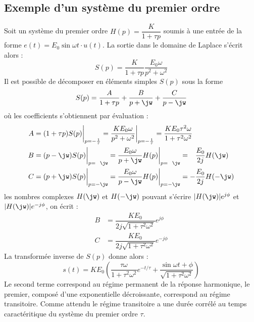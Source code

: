 \subsection{Exemple d'un système du premier ordre}
Soit un système du premier ordre $H(p)=\dfrac{K}{1+\tau p}$ soumis à une entrée
de la forme $e(t)=E_0\sin\omega t\cdot u(t)$. La sortie dans le domaine de
Laplace s'écrit alors :
\[
    S(p)=\dfrac{K}{1+\tau p}\dfrac{E_0\omega}{p^2+\omega^2}
\]
Il est possible de décomposer en éléments simples $S(p)$ sous la forme  
\[
    S(p)=\dfrac{A}{1+\tau p}+\dfrac{B}{p+\jw}+\dfrac{C}{p-\jw}
\]
où les coefficients s'obtiennent par évaluation :
\begin{align*}
    A&=(1+\tau p)S(p)\bigg|_{p=-\frac{1}{\tau}}=
       \dfrac{KE_0\omega}{p^2+\omega^2}\bigg|_{p=-\frac{1}{\tau}}=
       \dfrac{KE_0\tau^2\omega}{1+\tau^2\omega^2}\\
    B&=(p-\jw)S(p)\bigg|_{p=\hphantom{-}\jw}=
       \dfrac{E_0\omega}{p+\jw}H(p)\bigg|_{p=\hphantom{-}\jw}=
       \hphantom{-}\dfrac{E_0}{2j}H(\jw)\\
    C&=(p+\jw)S(p)\bigg|_{p=-\jw}=
       \dfrac{E_0\omega}{p-\jw}H(p)\bigg|_{p=-\jw}=
       -\dfrac{E_0}{2j}H(-\jw)
\end{align*}
les nombres complexes $H(\jw)$ et $H(-\jw)$ pouvant s'écrire 
$|H(\jw)|e^{j\phi}$ et $|H(\jw)|e^{-j\phi}$, on écrit :
\begin{align*}
    B &= \dfrac{KE_0}{2j\sqrt{1+\tau^2\omega^2}}e^{j\phi} \\
    C &= \dfrac{KE_0}{2j\sqrt{1+\tau^2\omega^2}}e^{-j\phi}
\end{align*}
La transformée inverse de $S(p)$ donne alors :
\[
    s(t)= KE_0\left( \dfrac{\tau\omega}{1+\tau^2\omega^2} e^{-t/\tau}
       + \dfrac{\sin{\omega t +\phi}}{\sqrt{1+\tau^2\omega^2}}\right)
\]
Le second terme correspond au régime permanent de la réponse harmonique,
le premier, composé d'une exponentielle décroissante, correspond au régime 
transitoire. Comme attendu le régime transitoire a une durée corrélé au temps
caractéritique du système du premier ordre $\tau$.

